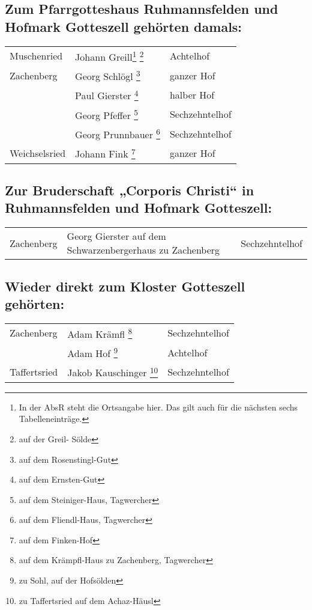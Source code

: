 \documentclass[12pt,a4pager,draft]{book}
\begin{document}
\subsection{Zum Pfarrgotteshaus Ruhmannsfelden und Hofmark Gotteszell gehörten
damals:}

\begin{longtable}{l|l|l}
Muschenried & Johann Greill\footnote{In der AbsR steht die Ortsangabe hier. Das
gilt auch für die nächsten sechs Tabelleneinträge.} \footnote{auf der Greil-
Sölde} & Achtelhof\\

Zachenberg & Georg Schlögl \footnote{auf dem Rosenstingl-Gut} & ganzer Hof\\
& Paul Gierster \footnote{auf dem Ernsten-Gut} & halber Hof\\
& Georg Pfeffer \footnote{auf dem Steiniger-Haus, Tagwercher} & Sechzehntelhof\\
& Georg Prunnbauer \footnote{auf dem Fliendl-Haus, Tagwercher} & Sechzehntelhof\\
Weichselsried & Johann Fink \footnote{auf dem Finken-Hof} & ganzer Hof\\
\end{longtable}

\subsection{Zur Bruderschaft „Corporis Christi“ in Ruhmannsfelden und Hofmark Gotteszell:}

\begin{longtable}{l|l|l}
Zachenberg & Georg Gierster auf dem Schwarzenbergerhaus zu Zachenberg &
Sechzehntelhof\\
\end{longtable}

\subsection{Wieder direkt zum Kloster Gotteszell gehörten:}

\begin{longtable}{l|l|l}
Zachenberg & Adam Krämfl \footnote{auf dem Krämpfl-Haus zu Zachenberg,
Tagwercher} & Sechzehntelhof\\

& Adam Hof \footnote{zu Sohl, auf der Hofsölden} & Achtelhof\\

Taffertsried & Jakob Kauschinger \footnote{zu Taffertsried auf dem Achaz-Häusl}
& Sechzehntelhof\\
\end{longtable}
\end{document}
